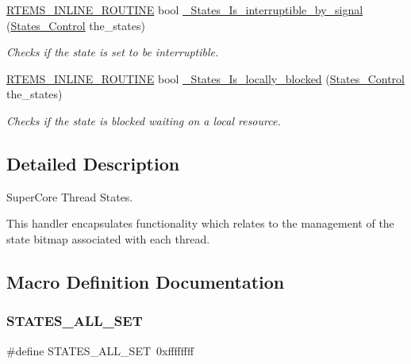 \begin{DoxyCompactItemize}
\mbox{\hyperlink{group__RTEMSScoreBaseDefs_gac216239df231d5dbd15e3520b0b9313f}{R\+T\+E\+M\+S\+\_\+\+I\+N\+L\+I\+N\+E\+\_\+\+R\+O\+U\+T\+I\+NE}} bool \mbox{\hyperlink{group__RTEMSScoreStates_ga868225cb2388d146eb99136f2d839deb}{\+\_\+\+States\+\_\+\+Is\+\_\+interruptible\+\_\+by\+\_\+signal}} (\mbox{\hyperlink{group__RTEMSScoreStates_gaeebbea0bfca162709b124fd519cf99d3}{States\+\_\+\+Control}} the\+\_\+states)
\begin{DoxyCompactList}\small\item\em Checks if the state is set to be interruptible. \end{DoxyCompactList}\item 
\mbox{\hyperlink{group__RTEMSScoreBaseDefs_gac216239df231d5dbd15e3520b0b9313f}{R\+T\+E\+M\+S\+\_\+\+I\+N\+L\+I\+N\+E\+\_\+\+R\+O\+U\+T\+I\+NE}} bool \mbox{\hyperlink{group__RTEMSScoreStates_ga7e400c2fe473664f779821942c007f54}{\+\_\+\+States\+\_\+\+Is\+\_\+locally\+\_\+blocked}} (\mbox{\hyperlink{group__RTEMSScoreStates_gaeebbea0bfca162709b124fd519cf99d3}{States\+\_\+\+Control}} the\+\_\+states)
\begin{DoxyCompactList}\small\item\em Checks if the state is blocked waiting on a local resource. \end{DoxyCompactList}\end{DoxyCompactItemize}


\subsection{Detailed Description}
Super\+Core Thread States. 

This handler encapsulates functionality which relates to the management of the state bitmap associated with each thread. 

\subsection{Macro Definition Documentation}
\mbox{\label{group__RTEMSScoreStates_gacd3ccb34703785a9d4b26f37df708494}} 
\subsubsection{\texorpdfstring{STATES\_ALL\_SET}{STATES\_ALL\_SET}}
{\footnotesize\ttfamily \#define S\+T\+A\+T\+E\+S\+\_\+\+A\+L\+L\+\_\+\+S\+ET~0xffffffff}

